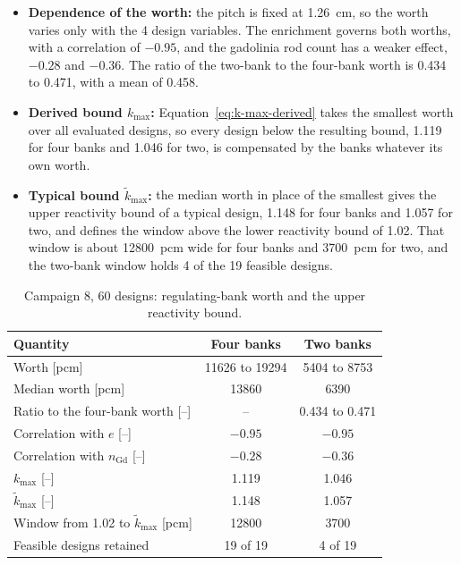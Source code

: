 \begin{itemize}
  \item \textbf{Dependence of the worth:} the pitch is fixed at
        \SI{1.26}{cm}, so the worth varies only with the 4 design
        variables. The enrichment governs both worths, with a correlation
        of $-0.95$, and the gadolinia rod count has a weaker effect,
        $-0.28$ and $-0.36$. The ratio of the two-bank to the four-bank
        worth is 0.434 to 0.471, with a mean of 0.458.

  \item \textbf{Derived bound $k_{\max}$:} Equation~\eqref{eq:k-max-derived}
        takes the smallest worth over all evaluated designs, so every design below
        the resulting bound, 1.119 for four banks and 1.046 for two, is
        compensated by the banks whatever its own worth.

  \item \textbf{Typical bound $\tilde{k}_{\max}$:} the median worth in
        place of the smallest gives the upper reactivity bound of a
        typical design, 1.148 for four banks and 1.057 for two, and
        defines the window above the lower reactivity bound of 1.02.
        That window is about \SI{12800}{pcm} wide for four banks and
        \SI{3700}{pcm} for two, and the two-bank window holds 4 of
        the 19 feasible designs.
\end{itemize}

\begin{table}[htbp]
  \centering
  \small
  \caption{Campaign 8, 60 designs: regulating-bank worth and the upper reactivity bound.}
  \label{tab:c8-worth}
  \begin{tabular}{@{}lcc@{}}
    \toprule
    Quantity & Four banks & Two banks \\
    \midrule
    Worth [pcm]                        & \num{11626} to \num{19294} & \num{5404} to \num{8753} \\
    Median worth [pcm]                 & \num{13860}                & \num{6390} \\
    Ratio to the four-bank worth [--]  & --                         & 0.434 to 0.471 \\
    \addlinespace
    Correlation with $e$ [--]          & $-0.95$                    & $-0.95$ \\
    Correlation with $n_\mathrm{Gd}$ [--] & $-0.28$                 & $-0.36$ \\
    \addlinespace
    $k_{\max}$ [--]                    & 1.119                      & 1.046 \\
    $\tilde{k}_{\max}$ [--]            & 1.148                      & 1.057 \\
    Window from 1.02 to $\tilde{k}_{\max}$ [pcm] & \num{12800}      & \num{3700} \\
    Feasible designs retained          & 19 of 19                   & 4 of 19 \\
    \bottomrule
  \end{tabular}
\end{table}

